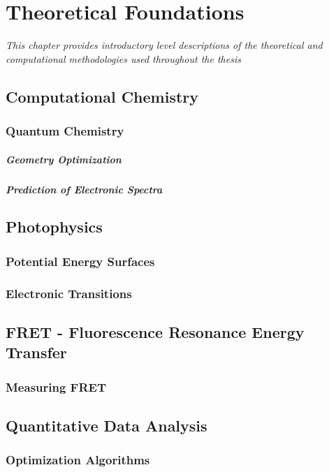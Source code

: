 \chapter{Theoretical Foundations}
\label{chap:Methodologies}
\textit{This chapter provides introductory level descriptions of the theoretical and computational methodologies used throughout the thesis}
\vspace{2ex}\vfill
\minitoc
\newpage

\section{Computational Chemistry}
\subsection{Quantum Chemistry}
\paragraph{Geometry Optimization}
\paragraph{Prediction of Electronic Spectra}

\section{Photophysics}
\subsection{Potential Energy Surfaces}
\subsection{Electronic Transitions}

\section{FRET - Fluorescence Resonance Energy Transfer}
\subsection{Measuring FRET}

\section{Quantitative Data Analysis}
\subsection{Optimization Algorithms}
